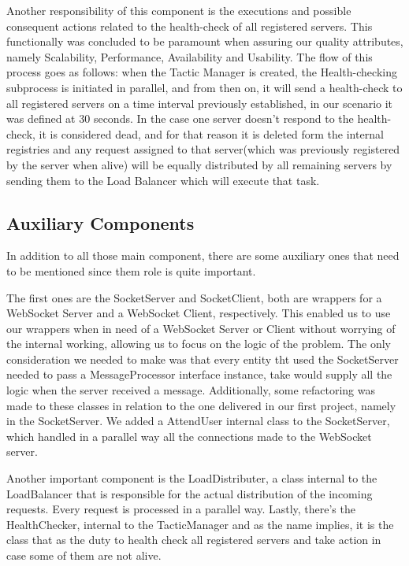 \documentclass[12pt]{article}
\begin{document}
Another responsibility of this component is the executions and possible consequent actions related to the health-check of all registered servers. This functionally was concluded to be paramount when assuring our quality attributes, namely Scalability, Performance, Availability and Usability. The flow of this process goes as follows: when the Tactic Manager is created, the Health-checking subprocess is initiated in parallel, and from then on, it will send a health-check to all registered servers on a time interval previously established, in our scenario it was defined at 30 seconds. In the case one server doesn't respond to the health-check, it is considered dead, and for that reason it is deleted form the internal registries and any request assigned to that server(which was previously registered by the server when alive) will be equally distributed by all remaining servers by sending them to the Load Balancer which will execute that task.

\subsection{Auxiliary Components}\label{aux}
In addition to all those  main component, there are some auxiliary ones that need to be mentioned since them role is quite important.

The first ones are the SocketServer and SocketClient, both are wrappers for a WebSocket Server and a WebSocket Client, respectively. This enabled us to use our wrappers when in need of a WebSocket Server or Client without worrying of the internal working, allowing us to focus on the logic of the problem. The only consideration we needed to make was that every entity tht used the SocketServer needed to pass a MessageProcessor interface instance, take would supply all the logic when the server received a message. Additionally, some refactoring was made to these classes in relation to the one delivered in our first project, namely in the SocketServer. We added a AttendUser internal class to the SocketServer, which handled in a parallel way all the connections made to the WebSocket server.

Another important component is the LoadDistributer, a class internal to the LoadBalancer that is responsible for the actual distribution of the incoming requests. Every request is processed in a parallel way. Lastly, there's the HealthChecker, internal to the TacticManager and as the name implies, it is the class that as the duty to health check all registered servers and take action in case some of them are not alive.
\end{document}
